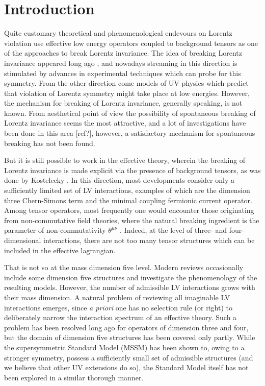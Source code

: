 \documentclass[12pt,preprintnumbers,nofootinbib]{revtex4}
\begin{document}
\section{Introduction}

	
	Quite customary theoretical and phenomenological endevours on
	Lorentz violation use effective 
	low energy operators coupled to background tensors 
	as one of the approaches to break 
	Lorentz invariance.
	The idea of breaking Lorentz invariance appeared
	long ago 
\cite{Pavlopoulos:1967dm}, 
	and nowadays streaming in this direction is
	stimulated by advances in experimental techniques which can
	probe for this symmetry.
	From the other direction come models of 
	UV physics 
\cite{DN,lcq,Vucetich:2005ra,Sahlmann:2002qk}
	which predict that violation of 
	Lorentz symmetry might take place at low energies.
	However, the mechanism for breaking of Lorentz invariance, generally
	speaking, is not known.
	From aesthetical point of view the possibility of spontaneous
	breaking of Lorentz invariance seems the most attractive, 
	and a lot of investigations have been done in this
	area [ref?], however, a satisfactory mechanism for spontaneous breaking has not
	been found. 

	But it is still possible to work in the effective theory, wherein the
	breaking of Lorentz invariance is made explicit via the 
	presence of background tensors, as was done by Kostelecky
\cite{Colladay:1996iz}.
	In this direction, most developments consider only a sufficiently limited set
	of LV interactions, examples of which are the dimension three
	Chern-Simons term and the minimal coupling fermionic current operator. 
	Among tensor operators, most frequently one would encounter 
	those originating from non-commutative field theories, where the
	natural breaking ingredient is the parameter of non-commutativity
	$ \theta^{\mu\nu} $ 
\cite{Mocioiu:2000ip}.
	Indeed, at the level of three- and four-dimensional interactions,
	there are not too many tensor structures which can be included
	in the effective lagrangian.	

	That is not so at the mass dimension five level.
	Modern reviews occasionally include some dimension five structures
	and investigate the phenomenology of the resulting models.
	However, the number of admissible LV interactions grows with their
	mass dimension.
	A natural problem of reviewing all imaginable LV interactions
	emerges, since {\it a priori} one has no selection rule (or right) to 
	deliberately narrow the interaction spectrum of an effective theory.
	Such a problem has been resolved long ago
\cite{Colladay:1998fq}
 	for operators of 
	dimension three and four, but the domain of dimension five structures has
	been covered only partly. 
	While the supersymmetric Standard Model (MSSM) has been shown to,
	owing to a stronger symmetry, possess a sufficiently small set of 
	admissible structures 
\cite{Bolokhov:2005cj}
	(and we believe that other
	UV extensions do so), the Standard Model itself has not 
	been explored in a similar thorough manner.
\end{document}
